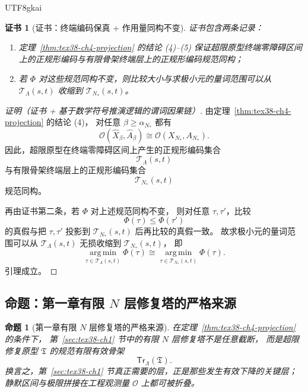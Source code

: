\documentclass[12pt]{article}
\newtheorem{proposition}{命题}[section]
\newtheorem{Certificate}{证书}[section]
\begin{document}
\begin{CJK*}{UTF8}{gkai}
\begin{Certificate}[证书：终端编码保真 + 作用量同构不变]
\label{cert:tex38-ch4-global}
证书包含两条记录：
\begin{enumerate}
  \item 定理~\ref{thm:tex38-ch4-projection} 的结论 (4)--(5) 保证超限原型终端零障碍区间上的正规形编码与有限骨架终端层上的正规形编码规范同构；
  \item 若 $\Phi$ 对这些规范同构不变，则比较大小与求极小元的量词范围可以从 $\mathcal T_{\Lambda}(s,t)$ 收缩到 $\mathcal T_{N_\ast}(s,t)$。
\end{enumerate}
\end{Certificate}

\begin{proof}[证明（证书 + 基于数学符号推演逻辑的谓词因果链）]
由定理~\ref{thm:tex38-ch4-projection} 的结论 (4)，
对任意 $\beta\ge\alpha_{N_\ast}$ 都有
\[
  \mathcal O(\widehat X_\beta,\widehat A_\beta)
  \cong
  \mathcal O(X_{N_\ast},A_{N_\ast}).
\]
因此，超限原型在终端零障碍区间上产生的正规形编码集合
\[
  \mathcal T_{\Lambda}(s,t)
\]
与有限骨架终端层上的正规形编码集合
\[
  \mathcal T_{N_\ast}(s,t)
\]
规范同构。

再由证书第二条，若 $\Phi$ 对上述规范同构不变，
则对任意 $\tau,\tau'$，比较
\[
  \Phi(\tau)\le \Phi(\tau')
\]
的真假与把 $\tau,\tau'$ 投影到 $\mathcal T_{N_\ast}(s,t)$ 后再比较的真假一致。
故求极小元的量词范围可以从 $\mathcal T_{\Lambda}(s,t)$ 无损收缩到 $\mathcal T_{N_\ast}(s,t)$，
即
\[
  \operatorname*{arg\,min}_{\tau\in\mathcal T_{\Lambda}(s,t)}\Phi(\tau)
  \cong
  \operatorname*{arg\,min}_{\tau\in\mathcal T_{N_\ast}(s,t)}\Phi(\tau).
\]
引理成立。
\end{proof}

\subsection{命题：第一章有限 \texorpdfstring{$N$}{N} 层修复塔的严格来源}
\label{subsec:tex38-ch4-proposition}

\begin{proposition}[第一章有限 \texorpdfstring{$N$}{N} 层修复塔的严格来源]
\label{prop:tex38-ch4-source}
在定理~\ref{thm:tex38-ch4-projection} 的条件下，
第~\ref{sec:tex38-ch1} 节中的有限 $N$ 层修复塔不是任意截断，
而是超限修复原型 $\mathfrak T$ 的规范有限有效骨架
\[
  \mathsf{Tr}_\Lambda(\mathfrak T).
\]
换言之，第~\ref{sec:tex38-ch1} 节真正需要的层，正是那些发生有效下降的关键层；
静默区间与极限拼接在工程观测量 $\mathcal O$ 上都可被折叠。
\end{proposition}


\end{CJK*}
\end{document}
